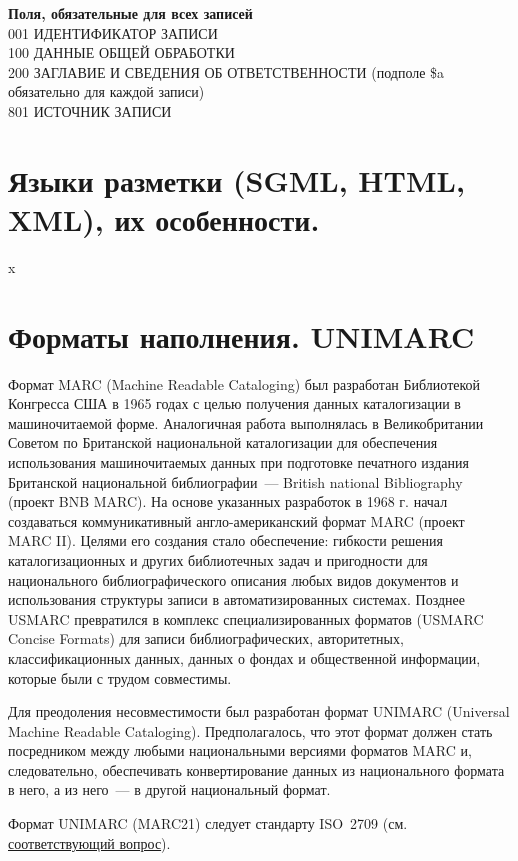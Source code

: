 \documentclass[12pt]{article}
\theoremstyle{definition}
\theoremstyle{remark}
\numberwithin{equation}{section}
\begin{document}
\textbf{Поля, обязательные для всех записей}
\\
001 ИДЕНТИФИКАТОР ЗАПИСИ \\
100 ДАННЫЕ ОБЩЕЙ ОБРАБОТКИ \\
200 ЗАГЛАВИЕ И СВЕДЕНИЯ ОБ ОТВЕТСТВЕННОСТИ (подполе \$a обязательно для каждой записи) \\
801 ИСТОЧНИК ЗАПИСИ \\

\section{Языки разметки (SGML, HTML, XML), их особенности.}
x
\section{Форматы наполнения. UNIMARC}
Формат MARC (Machine Readable Cataloging) был разработан Библиотекой Конгресса США в 1965 годах с целью получения данных каталогизации в машиночитаемой форме. Аналогичная работа выполнялась в Великобритании Советом по Британской национальной каталогизации для обеспечения использования машиночитаемых данных при подготовке печатного издания Британской национальной библиографии~--- British national Bibliography (проект BNB MARC). На основе указанных разработок в 1968 г. начал создаваться коммуникативный англо\nobreakdash-американский формат MARC (проект MARC II). Целями его создания стало обеспечение: гибкости решения каталогизационных и других библиотечных задач и пригодности для национального библиографического описания любых видов документов и использования структуры записи в автоматизированных системах. Позднее USMARC превратился в комплекс специализированных форматов (USMARC Concise Formats) для записи библиографических, авторитетных, классификационных данных, данных о фондах и общественной информации, которые были с трудом совместимы.

Для преодоления несовместимости был разработан формат UNIMARC (Universal Machine Readable Cataloging). Предполагалось, что этот формат должен стать посредником между любыми национальными версиями форматов MARC и, следовательно, обеспечивать конвертирование данных из национального формата в него, а из него~--- в другой национальный формат.

Формат UNIMARC (MARC21) следует стандарту ISO~2709 (см. \hyperref[subsec:ISO]{соответствующий вопрос}).
\end{document}
